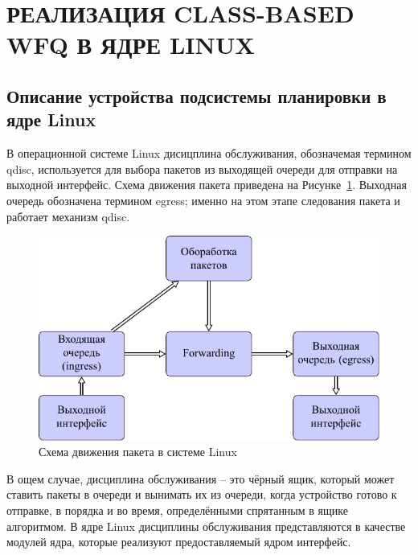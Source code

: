 \section{РЕАЛИЗАЦИЯ CLASS-BASED WFQ В ЯДРЕ LINUX}

	\subsection{Описание устройства подсистемы планировки в ядре Linux}

	В операционной системе Linux
	дисицплина обслуживания, обозначемая термином qdisc, используется
	для выбора пакетов из выходящей очереди для отправки на выходной интерфейс.
	Схема движения пакета приведена на Рисунке~\ref{pic:flow}. Выходная очередь
	обозначена термином egress; именно на этом этапе следования пакета
	и работает механизм qdisc.\cite{lartc}

    \begin{figure}[ht!]
        \center
        \includegraphics{pdfimages/qdisc.pdf}
        \caption{Схема движения пакета в системе Linux\cite{tcpip}}
		\label{pic:flow}
    \end{figure}


	В ощем случае, дисциплина обслуживания -- это чёрный ящик, который может
	ставить пакеты в очереди и вынимать их из очереди, когда устройство
	готово к отправке, в порядка и во время, определёнными спрятанным в ящике
	алгоритмом. В ядре Linux дисциплины обслуживания представляются в качестве
	модулей ядра, которые реализуют предоставляемый ядром интерфейс.

